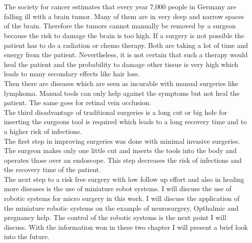 \chapter{}
\label{sec:Introduction}
The society for cancer estimates that every year 7,000 people in Germany are falling ill with a brain tumor. Many of them are in very deep and narrow spaces of the brain. Therefore the tumors cannot manually be removed by a surgeon because the risk to damage the brain is too high. If a surgery is not possible the patient has to do a radiation or chemo therapy. Both are taking a lot of time and energy from the patient. Nevertheless, it is not certain that such a therapy would heal the patient and the probability to damage other tissue is very high which leads to many secondary effects like hair loss. \\
Then there are diseases which are seen as incurable with manual surgeries like lymphoma. Manual tools can only help against the symptoms but not heal the patient. The same goes for retinal vein occlusion. \\
The third disadvantage of traditional surgeries is a long cut or big hole for inserting the surgeons tool is required which leads to a long recovery time and to a higher risk of infections.\\
The first step in improving surgeries was done with minimal invasive surgeries. The surgeon makes only one little cut and inserts the tools into the body and operates those over an endoscope. This step decreases the risk of infections and the recovery time of the patient.\\
The next step to a risk free surgery with low follow up effort and also in healing more diseases is the use of miniature robot systems. I will discuss the use of robotic systems for micro surgery in this work. I will discuss the application of the miniature robotic systems on the example of neurosurgery, Opthalmic and pregnancy help. The control of the robotic systems is the next point I will discuss. With the information won in these two chapter I will present a brief look into the future.
